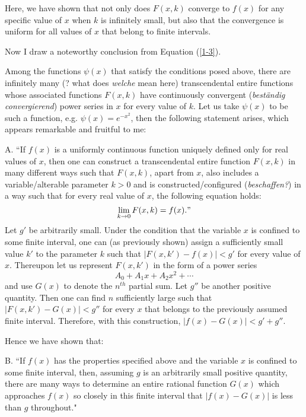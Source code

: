 \documentclass{article}
\begin{document}
Here, we have shown that not only does $F(x,k)$ converge to $f(x)$ for any specific value of $x$ when $k$ is infinitely small, but also that the convergence is uniform for all values of $x$ that belong to finite intervals.


Now I draw a noteworthy conclusion from Equation (\ref{1-3}). 

Among the functions $\psi(x)$ that satisfy the conditions posed above, there are infinitely many (? what does \textit{welche} mean here) transcendental entire functions whose associated functions $F(x,k)$ have continuously convergent (\textit{best\"{a}ndig convergierend}) power series in $x$ for every value of $k$. Let us take $\psi(x)$ to be such a function, e.g. $\psi(x)=e^{-x^2}$, then the following statement arises, which appears remarkable and fruitful to me:

A. ``If $f(x)$ is a uniformly continuous function uniquely defined only for real values of $x$, then one can construct a transcendental entire function $F(x,k)$ in many different ways such that $F(x,k)$, apart from $x$, also includes a variable/alterable parameter $k>0$ and is constructed/configured (\textit{beschaffen?}) in a way such that for every real value of $x$, the following equation holds:
\begin{equation}
\lim_{k\rightarrow 0} F(x,k)=f(x)."
\end{equation}
Let $g'$ be arbitrarily small. Under the condition that the variable $x$ is confined to some finite interval, one can (as previously shown) assign a sufficiently small value $k'$ to the parameter $k$ such that $|F(x,k')-f(x)|<g'$ for every value of $x$. Thereupon let us represent $F(x,k')$ in the form of a power series
\begin{equation*}
    A_0+A_1x+A_2x^2+\cdots
\end{equation*}
and use $G(x)$ to denote the $n^{th}$ partial sum. Let $g''$ be another positive quantity. Then one can find $n$ sufficiently large such that $|F(x,k')-G(x)|<g''$ for every $x$ that belongs to the previously assumed finite interval. Therefore, with this construction, $|f(x)-G(x)|<g'+g''$. 

Hence we have shown that:

B. ``If $f(x)$ has the properties specified above and the variable $x$ is confined to some finite interval, then, assuming $g$ is an arbitrarily small positive quantity, there are many ways to determine an entire rational function $G(x)$ which approaches $f(x)$ so closely in this finite interval that $|f(x)-G(x)|$ is less than $g$ throughout."
\end{document}
